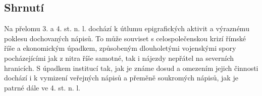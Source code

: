 
\subsection[shrnutí-20]{Shrnutí}

Na přelomu 3. a 4. st. n. l. dochází k útlumu epigrafických aktivit a výraznému poklesu dochovaných nápisů. To může souviset s celospolečenskou krizí římské říše a ekonomickým úpadkem, způsobeným dlouholetými vojenskými spory pocházejícími jak z nitra říše samotné, tak i nájezdy nepřátel na severních hranicích. S úpadkem institucí tak, jak je známe dosud a omezením jejich činnosti dochází i k vymizení veřejných nápisů a přeměně soukromých nápisů, jak je patrné dále ve 4. st. n. l.

